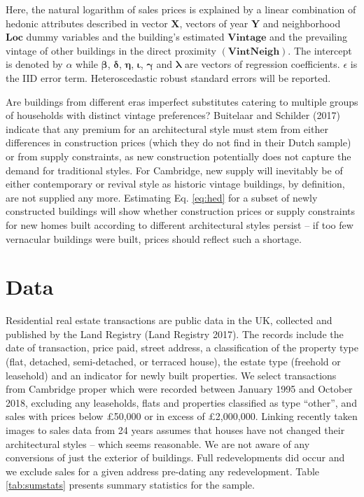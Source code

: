 \documentclass[]{article}
\begin{document}
Here, the natural logarithm of sales prices is explained by a linear
combination of hedonic attributes described in vector \(\mathbf{X}\),
vectors of year \(\mathbf{Y}\) and neighborhood \(\bm{Loc}\) dummy
variables and the building's estimated \(\mathbf{Vintage}\) and the
prevailing vintage of other buildings in the direct proximity
\((\mathbf{VintNeigh})\). The intercept is denoted by \(\alpha\) while
\(\bm{\beta}\), \(\bm{\delta}\), \(\bm{\eta}\), \(\bm{\iota}\),
\(\bm{\gamma}\) and \(\bm{\lambda}\) are vectors of regression
coefficients. \(\epsilon\) is the IID error term. Heteroscedastic robust
standard errors will be reported.

Are buildings from different eras imperfect substitutes catering to
multiple groups of households with distinct vintage preferences?
Buitelaar and Schilder (2017) indicate that any premium for an
architectural style must stem from either differences in construction
prices (which they do not find in their Dutch sample) or from supply
constraints, as new construction potentially does not capture the demand
for traditional styles. For Cambridge, new supply will inevitably be of
either contemporary or revival style as historic vintage buildings, by
definition, are not supplied any more. Estimating Eq. \ref{eq:hed} for a
subset of newly constructed buildings will show whether construction
prices or supply constraints for new homes built according to different
architectural styles persist -- if too few vernacular buildings were
built, prices should reflect such a shortage.

\hypertarget{data}{%
\section{Data}\label{data}}

Residential real estate transactions are public data in the UK,
collected and published by the Land Registry (Land Registry 2017). The
records include the date of transaction, price paid, street address, a
classification of the property type (flat, detached, semi-detached, or
terraced house), the estate type (freehold or leasehold) and an
indicator for newly built properties. We select transactions from
Cambridge proper which were recorded between January 1995 and October
2018, excluding any leaseholds, flats and properties classified as type
``other'', and sales with prices below £50,000 or in excess of
£2,000,000. Linking recently taken images to sales data from 24 years
assumes that houses have not changed their architectural styles -- which
seems reasonable. We are not aware of any conversions of just the
exterior of buildings. Full redevelopments did occur and we exclude
sales for a given address pre-dating any redevelopment. Table
\ref{tab:sumstats} presents summary statistics for the sample.
\end{document}
